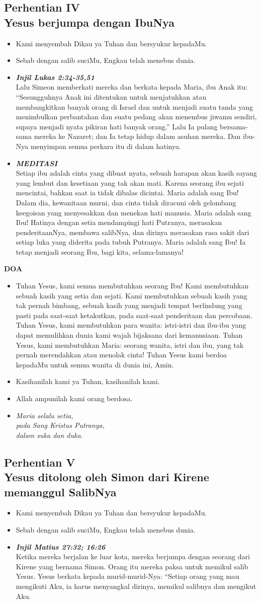 \documentclass[a5paper,titlepage,11pt,openany]{scrbook}
\newcommand{\BU}[1]{\begin{itemize} \item[U:] #1 \end{itemize}}
\newcommand{\BP}[1]{\begin{itemize} \item[P:] #1 \end{itemize}}
\newcommand{\kamiMenyembah}{\BP{ Kami menyembah Dikau ya Tuhan dan bersyukur kepadaMu.}
\BU{Sebab dengan salib suciMu, Engkau telah menebus dunia.}
}
\newcommand{\kasihanilahKami}{\BP{Kasihanilah kami ya Tuhan, kasihanilah kami.}
\BU{Allah ampunilah kami orang berdosa.}}
\newcommand{\BPi}[2]
{\begin{itemize} \item[P1:] \textbf{\emph{#1}}\\#2 \end{itemize}}
\newcommand{\BPii}[1]
{\begin{itemize} \item[P2:] \textbf{\emph{MEDITASI}}\\#1 \end{itemize}}
\newcommand{\lagu}[2]{%
\begin{itemize}
\item[#1.] \it{#2}
\end{itemize}}
\newcommand{\henti}[2]{%
\subsection*{Perhentian #1\\#2 } 
\kamiMenyembah
}
\begin{document}
\henti{IV}{Yesus berjumpa dengan IbuNya}

\BPi{Injil Lukas 2:34-35,51}{%
Lalu Simeon memberkati mereka dan berkata kepada Maria, ibu Anak itu: \\``Sesungguhnya Anak ini ditentukan untuk menjatuhkan atau membangkitkan banyak orang di Israel dan untuk menjadi suatu tanda yang menimbulkan perbantahan dan suatu pedang akan menembus jiwamu sendiri, supaya menjadi nyata pikiran hati banyak orang.'' Lalu Ia pulang bersama-sama mereka ke Nazaret; dan Ia tetap hidup dalam asuhan mereka. Dan ibu-Nya menyimpan semua perkara itu di dalam hatinya. }

\BPii{
Setiap ibu adalah cinta yang dibuat nyata, sebuah harapan akan kasih sayang yang lembut dan kesetiaan yang tak akan mati. Karena seorang ibu sejati mencintai, bahkan saat ia tidak dibalas dicintai. Maria adalah sang Ibu! Dalam dia, kewanitaan murni, dan cinta tidak diracuni oleh gelombang keegoisan yang menyesakkan dan menekan hati manusia. Maria adalah sang Ibu! Hatinya dengan setia mendampingi hati Putranya, merasakan penderitaanNya, membawa salibNya, dan dirinya merasakan rasa sakit dari setiap luka yang diderita pada tubuh Putranya. Maria adalah sang Ibu! Ia tetap menjadi seorang Ibu, bagi kita, selama-lamanya! }

\textbf{DOA}

\BU{Tuhan Yesus, kami semua membutuhkan seorang Ibu! Kami membutuhkan sebuah kasih yang setia dan sejati. Kami membutuhkan sebuah kasih yang tak pernah bimbang, sebuah kasih yang menjadi tempat berlindung yang pasti pada saat-saat ketakutkan, pada saat-saat penderitaan dan percobaan. Tuhan Yesus, kami membutuhkan para wanita: istri-istri dan ibu-ibu yang dapat memulihkan dunia kami wajah bijaksana dari kemanusiaan. Tuhan Yesus, kami membutuhkan Maria: seorang wanita, istri dan ibu, yang tak pernah merendahkan atau menolak cinta! Tuhan Yesus kami berdoa kepadaMu untuk semua wanita di dunia ini, Amin.}


\kasihanilahKami

\lagu{5}{Maria selalu setia,\\
pada Sang Kristus Putranya,\\
dalam suka dan duka.}

\henti{V}{Yesus ditolong oleh Simon dari Kirene memanggul SalibNya}

\BPi{Injil Matius 27:32; 16:26 }{
	Ketika mereka berjalan ke luar kota, mereka berjumpa dengan seorang dari Kirene yang bernama Simon. Orang itu mereka paksa untuk memikul salib Yesus. Yesus berkata kepada murid-murid-Nya: ``Setiap orang yang mau mengikuti Aku, ia harus menyangkal dirinya, memikul salibnya dan mengikut Aku. }
\end{document}
